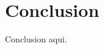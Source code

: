 \documentclass[journal]{IEEEtran}
\begin{document}
%
%


%





\section{Conclusion}
Conclusion aqui.
\end{document}

